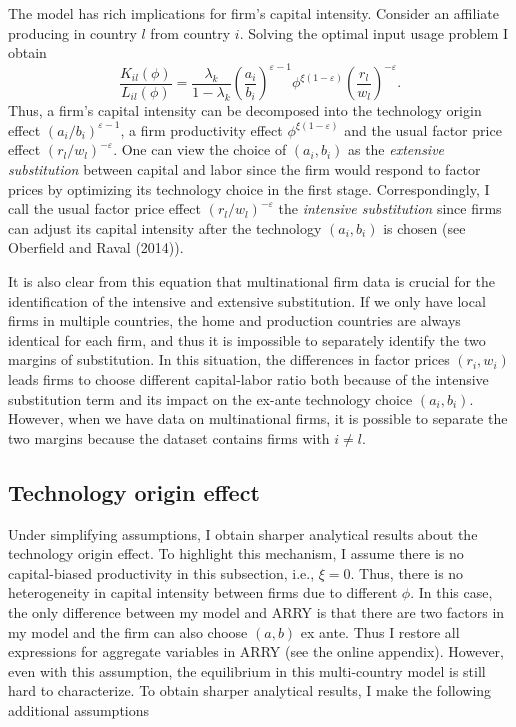 \documentclass[notitlepage,11pt]{article}%
\begin{document}
The model has rich implications for firm's capital intensity. Consider an
affiliate producing in country $l$ from country $i$. Solving the optimal input
usage problem I obtain%
\[
\frac{K_{il}\left(  \phi\right)  }{L_{il}\left(  \phi\right)  }=\frac
{\lambda_{k}}{1-\lambda_{k}}\left(  \frac{a_{i}}{b_{i}}\right)  ^{\varepsilon
-1}\phi^{\xi\left(  1-\varepsilon\right)  }\left(  \frac{r_{l}}{w_{l}}\right)
^{-\varepsilon}.
\]
Thus, a firm's capital intensity can be decomposed into the technology origin
effect $\left(  a_{i}/b_{i}\right)  ^{\varepsilon-1}$, a firm productivity
effect $\phi^{\xi\left(  1-\varepsilon\right)  }$ and the usual factor price
effect $\left(  r_{l}/w_{l}\right)  ^{-\varepsilon}$. One can view the choice
of $\left(  a_{i},b_{i}\right)  $ as the \emph{extensive substitution} between
capital and labor since the firm would respond to factor prices by optimizing
its technology choice in the first stage. Correspondingly, I call the usual
factor price effect $\left(  r_{l}/w_{l}\right)  ^{-\varepsilon}$ the
\emph{intensive substitution }since firms can adjust its capital intensity
after the technology $\left(  a_{i},b_{i}\right)  $ is chosen (see Oberfield
and Raval (2014)).

It is also clear from this equation that multinational firm data is crucial
for the identification of the intensive and extensive substitution. If we only
have local firms in multiple countries, the home and production countries are
always identical for each firm, and thus it is impossible to separately
identify the two margins of substitution. In this situation, the differences
in factor prices $\left(  r_{i},w_{i}\right)  $ leads firms to choose
different capital-labor ratio both because of the intensive substitution term
and its impact on the ex-ante technology choice $\left(  a_{i},b_{i}\right)
$. However, when we have data on multinational firms, it is possible to
separate the two margins because the dataset contains firms with $i\neq l$.

\subsection{Technology origin effect \label{sec:toe_theory}}

Under simplifying assumptions, I obtain sharper analytical results about the
technology origin effect. To highlight this mechanism, I assume there is no
capital-biased productivity in this subsection, i.e., $\xi=0$. Thus, there is
no heterogeneity in capital intensity between firms due to different $\phi$.
In this case, the only difference between my model and ARRY is that there are
two factors in my model and the firm can also choose $\left(  a,b\right)  $ ex
ante. Thus I restore all expressions for aggregate variables in ARRY (see the
online appendix). However, even with this assumption, the equilibrium in this
multi-country model is still hard to characterize. To obtain sharper
analytical results, I make the following additional assumptions
\end{document}
